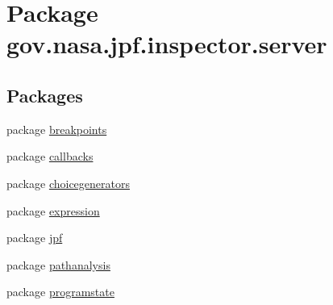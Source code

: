 \hypertarget{namespacegov_1_1nasa_1_1jpf_1_1inspector_1_1server}{}\section{Package gov.\+nasa.\+jpf.\+inspector.\+server}
\label{namespacegov_1_1nasa_1_1jpf_1_1inspector_1_1server}
\subsection*{Packages}
\begin{DoxyCompactItemize}
\item 
package \hyperlink{namespacegov_1_1nasa_1_1jpf_1_1inspector_1_1server_1_1breakpoints}{breakpoints}
\item 
package \hyperlink{namespacegov_1_1nasa_1_1jpf_1_1inspector_1_1server_1_1callbacks}{callbacks}
\item 
package \hyperlink{namespacegov_1_1nasa_1_1jpf_1_1inspector_1_1server_1_1choicegenerators}{choicegenerators}
\item 
package \hyperlink{namespacegov_1_1nasa_1_1jpf_1_1inspector_1_1server_1_1expression}{expression}
\item 
package \hyperlink{namespacegov_1_1nasa_1_1jpf_1_1inspector_1_1server_1_1jpf}{jpf}
\item 
package \hyperlink{namespacegov_1_1nasa_1_1jpf_1_1inspector_1_1server_1_1pathanalysis}{pathanalysis}
\item 
package \hyperlink{namespacegov_1_1nasa_1_1jpf_1_1inspector_1_1server_1_1programstate}{programstate}
\end{DoxyCompactItemize}
